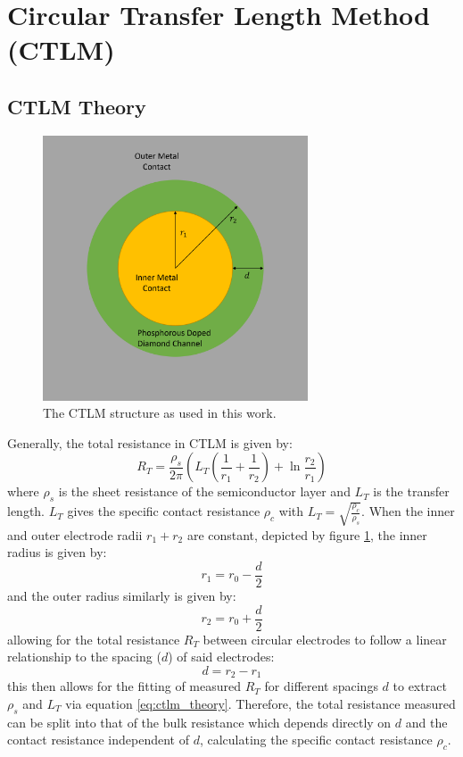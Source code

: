 \section{Circular Transfer Length Method (CTLM)}
\subsection{CTLM Theory}
\begin{figure}[h]
    \centering
    \includegraphics[width=0.7\textwidth]{Chapter6/Figs/Raster/CTLM design.png}
    \caption{The CTLM structure as used in this work.}
    \label{fig:ctlm_structure}
\end{figure}
Generally, the total resistance in CTLM is given by:
\begin{equation}
    R_{T} = \frac{\rho_{s}}{2\pi} \left(L_{T}\left(\frac{1}{r_{1}}+\frac{1}{r_{2}}\right)+\ln{\frac{r_{2}}{r_{1}}}\right)
    \label{eq:ctlm_theory}
\end{equation}
where $\rho_{s}$ is the sheet resistance of the semiconductor layer and $L_{T}$ is the transfer length. $L_{T}$ gives the specific contact resistance $\rho_{c}$ with $L_{T}=\sqrt{\frac{\rho_{c}}{\rho_{s}}}$. When the inner and outer electrode radii $r_{1}+r_{2}$ are constant, depicted by figure \ref{fig:ctlm_structure}, the inner radius is given by:
\begin{equation}
    r_{1} = r_{0} - \frac{d}{2}
\end{equation}
and the outer radius similarly is given by:
\begin{equation}
    r_{2} = r_{0} + \frac{d}{2}
\end{equation}
allowing for the total resistance $R_{T}$ between circular electrodes to follow a linear relationship to the spacing ($d$) of said electrodes:
\begin{equation}
    d = r_{2} - r_{1}
\end{equation}
this then allows for the fitting of measured $R_{T}$ for different spacings $d$ to extract $\rho_{s}$ and $L_{T}$ via equation \ref{eq:ctlm_theory}. Therefore, the total resistance measured can be split into that of the bulk resistance which depends directly on $d$ and the contact resistance independent of $d$, calculating the specific contact resistance $\rho_{c}$. 

